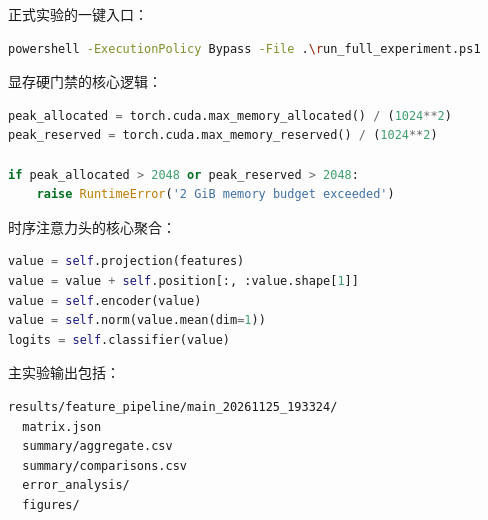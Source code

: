 \vspace{1.1em}

正式实验的一键入口：

\begin{lstlisting}[language=bash]
powershell -ExecutionPolicy Bypass -File .\run_full_experiment.ps1
\end{lstlisting}

显存硬门禁的核心逻辑：

\begin{lstlisting}[language=Python]
peak_allocated = torch.cuda.max_memory_allocated() / (1024**2)
peak_reserved = torch.cuda.max_memory_reserved() / (1024**2)

if peak_allocated > 2048 or peak_reserved > 2048:
    raise RuntimeError('2 GiB memory budget exceeded')
\end{lstlisting}

时序注意力头的核心聚合：

\begin{lstlisting}[language=Python]
value = self.projection(features)
value = value + self.position[:, :value.shape[1]]
value = self.encoder(value)
value = self.norm(value.mean(dim=1))
logits = self.classifier(value)
\end{lstlisting}

主实验输出包括：

\begin{lstlisting}[language=bash]
results/feature_pipeline/main_20261125_193324/
  matrix.json
  summary/aggregate.csv
  summary/comparisons.csv
  error_analysis/
  figures/
\end{lstlisting}
